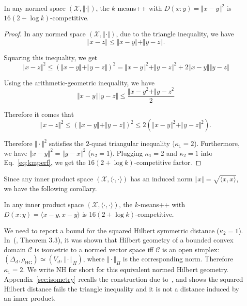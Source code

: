\documentclass[graybox]{svmult}
\def\calX{\mathcal{X}}
\def\calC{\mathcal{C}}
\def\inner#1#2{ \langle {#1},{#2} \rangle }
\def\HG{\mathrm{HG}}
\def\NH{\mathrm{NH}}  %
\begin{document}
\begin{theorem}\label{theo:kmns}
In any normed space $(\calX,\Vert\cdot\Vert)$,
the $k$-means++ with $D(x:y)=\Vert{x-y}\Vert^2$ is $16(2+\log k)$-competitive.
\end{theorem}
\begin{proof}
In any normed space $(\calX,\Vert\cdot\Vert)$, due to the triangle inequality,
we have
$$
\Vert{}x-z\Vert\le\Vert{x-y}\Vert+\Vert{y-z}\Vert.
$$

Squaring this inequality, we get
$$
\Vert{}x-z\Vert^2  \le (\Vert{x-y}\Vert+\Vert{y-z}\Vert)^2=\Vert{x-y}\Vert^2 + \Vert{y-z}\Vert^2 + 2\Vert{x-y}\Vert\Vert{y-z}\Vert
$$

Using the arithmetic-geometric inequality, we have 
$$
\Vert{x-y}\Vert \Vert{y-z}\Vert \leq \frac{\Vert{x-y}^2 + \Vert{y-z}^2}{2}
$$


Therefore it comes that
$$
\Vert{}x-z\Vert^2
\le(\Vert{x-y}\Vert+\Vert{y-z}\Vert)^2
\le2(\Vert{x-y}\Vert^2+\Vert{y-z}\Vert^2).
$$


Therefore $\Vert\cdot\Vert^2$ satisfies the $2$-quasi triangular inequality
($\kappa_1=2$).
Furthermore, we have $\Vert{x-y}\Vert^2=\Vert{y-x}\Vert^2$ ($\kappa_2=1$).
Plugging $\kappa_1=2$ and $\kappa_2=1$ into Eq.~\ref{eq:kmperf},
we get the $16(2+\log k)$-competitive factor.
\end{proof}

Since any inner product space $(\calX,\inner{\cdot}{\cdot})$ has an induced norm 
$\Vert{x}\Vert=\sqrt{\inner{x}{x}}$, we have the following corollary.
\begin{corollary}
In any inner product space $(\calX,\inner{\cdot}{\cdot})$, 
the $k$-means++ with $D(x:y)=\inner{x-y}{x-y}$ is $16(2+\log k)$-competitive.
\end{corollary}

We need to report a bound for the squared Hilbert symmetric distance ($\kappa_2=1$).
In~(\cite{BH-2014}, Theorem 3.3), it was shown that Hilbert geometry of a bounded convex domain $\calC$ is isometric to a normed vector space iff
$\calC$ is an open simplex:  $(\Delta_d,\rho_\HG)\simeq (V_d,\Vert\cdot\Vert_H)$, where $\Vert\cdot\Vert_H$ is the corresponding norm.
Therefore $\kappa_1=2$. We write $\NH$ for short for this equivalent normed Hilbert geometry.
Appendix~\ref{sec:isometry} recalls the construction due to~\cite{HilbertHarpe-1991},
and shows the squared Hilbert distance fails the triangle inequality
and it is not a distance induced by an inner product.
\end{document}
